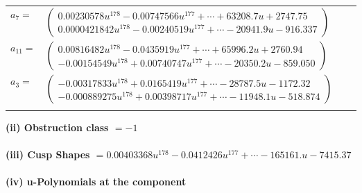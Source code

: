 \documentclass[1p]{elsarticle_modified}
\theoremstyle{definition}
\begin{document}
\begin{tabular}{m{7pt} m{180pt} m{7pt} m{180pt} }
\flushright $a_{7}=$&$\begin{pmatrix}0.00230578 u^{178}-0.00747566 u^{177}+\cdots+63208.7 u+2747.75\\0.0000421842 u^{178}-0.00240519 u^{177}+\cdots-20941.9 u-916.337\end{pmatrix}$ \\
\flushright $a_{11}=$&$\begin{pmatrix}0.00816482 u^{178}-0.0435919 u^{177}+\cdots+65996.2 u+2760.94\\-0.00154549 u^{178}+0.00740747 u^{177}+\cdots-20350.2 u-859.050\end{pmatrix}$ \\
\flushright $a_{3}=$&$\begin{pmatrix}-0.00317833 u^{178}+0.0165419 u^{177}+\cdots-28787.5 u-1172.32\\-0.000889275 u^{178}+0.00398717 u^{177}+\cdots-11948.1 u-518.874\end{pmatrix}$\\&\end{tabular}
\flushleft \textbf{(ii) Obstruction class $= -1$}\\~\\
\flushleft \textbf{(iii) Cusp Shapes $= 0.00403368 u^{178}-0.0412426 u^{177}+\cdots-165161. u-7415.37$}\\~\\
\newpage\renewcommand{\arraystretch}{1}
\flushleft \textbf{(iv) u-Polynomials at the component}\newline \\
\end{document}
